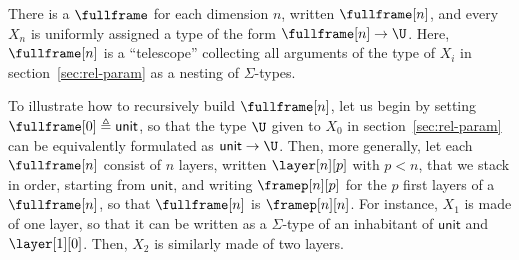 \documentclass{art.cls/art}
\newcommand{\unittype}{\ensuremath{\mathsf{unit}}}
\newcommand{\defeq}{\ensuremath{\triangleq}}
\begin{document}
There is a $\fullframe$ for each dimension $n$, written $\fullframe[n]$, and every $X_n$ is uniformly assigned a type of the form $\fullframe[n] \rightarrow \U$. Here, $\fullframe[n]$ is a ``telescope'' collecting all arguments of the type of $X_i$ in section~\ref{sec:rel-param} as a nesting of $\Sigma$-types.

To illustrate how to recursively build $\fullframe[n]$, let us begin by setting $\fullframe[0] \defeq \unittype$, so that the type $\U$ given to $X_0$ in section~\ref{sec:rel-param} can be equivalently formulated as $\unittype \rightarrow \U$. Then, more generally, let each $\fullframe[n]$ consist of $n$ layers, written $\layer[n][p]$ with $p < n$, that we stack in order, starting from $\unittype$, and writing $\framep[n][p]$ for the $p$ first layers of a $\fullframe[n]$, so that $\fullframe[n]$ is $\framep[n][n]$. For instance, $X_1$ is made of one layer, so that it can be written as a $\Sigma$-type of an inhabitant of $\unittype$ and $\layer[1][0]$. Then, $X_2$ is similarly made of two layers.
\end{document}

